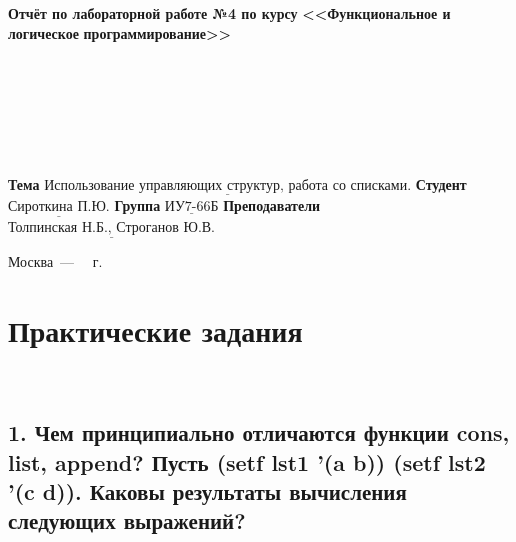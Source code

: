 \documentclass[12pt]{report}
\begin{document}
\begin{titlepage}
	
	\begin{center}
		\noindent\begin{minipage}{1.3\textwidth}\centering
			\Large\textbf{  Отчёт по лабораторной работе №4 по курсу}\newline\newline
			\textbf{<<Функциональное и логическое}\newline
			\textbf{\indent\indent\indent программирование>>}\newline
		\end{minipage}
	\end{center}
	
	~\\\\\\\\\\\\
	\large
	\noindent\textbf{Тема } $\underline{\text{Использование управляющих структур, работа со списками.}}$\newline\newline
	\noindent\textbf{Студент } $\underline{\text{Сироткина П.Ю.}}$\newline\newline
	\noindent\textbf{Группа } $\underline{\text{ИУ7-66Б}}$\newline\newline
	\noindent\textbf{Преподаватели } $\underline{\text{Толпинская Н.Б., Строганов Ю.В.}}$\newline\newline\newline
	
	\begin{center}
		\vfill
		Москва~---~\the\year
		~г.
	\end{center}
\end{titlepage}

\chapter*{Практические задания}

~\

\section*{1. Чем принципиально отличаются функции cons, list, append? Пусть (setf lst1 '(a b)) (setf lst2 '(c d)). Каковы результаты вычисления следующих выражений?}
\end{document}
